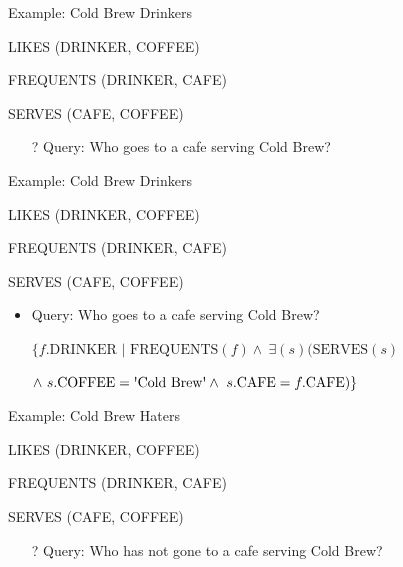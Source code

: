 \documentclass[aspectratio=169]{beamer}
\begin{document}
\begin{frame}{Example: Cold Brew Drinkers}

LIKES (DRINKER, COFFEE)

FREQUENTS (DRINKER, CAFE)

SERVES (CAFE, COFFEE)

\begin{itemize}
\item[?] Query: Who goes to a cafe serving Cold Brew?
\end{itemize}
\end{frame}

\begin{frame}{Example: Cold Brew  Drinkers}

LIKES (DRINKER, COFFEE)

FREQUENTS (DRINKER, CAFE)

SERVES (CAFE, COFFEE)

\begin{itemize}
\item Query: Who goes to a cafe serving Cold Brew?

\vspace{10 pt}
$\{f.\textrm{DRINKER } | \textrm{ FREQUENTS}(f) \wedge\ \exists(s)(\textrm{SERVES}(s)$

$\wedge\ s.\textrm{COFFEE} = \textrm{\textquotesingle{Cold} Brew\textquotesingle}
	\wedge\ s.\textrm{CAFE} = f.\textrm{CAFE})\}$
\end{itemize}
\end{frame}

\begin{frame}{Example: Cold Brew  Haters}

LIKES (DRINKER, COFFEE)

FREQUENTS (DRINKER, CAFE)

SERVES (CAFE, COFFEE)

\begin{itemize}
\item[?] Query: Who has not gone to a cafe serving Cold Brew?
\end{itemize}
\end{frame}
\end{document}
